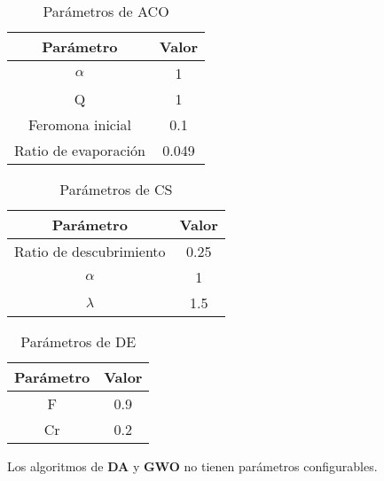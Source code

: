 \begin{table}[H]
    \centering
    \begin{tabular}{ c c }
        \hline
        \textbf{Parámetro}   & \textbf{Valor} \\
        \hline
        $\alpha$             & 1              \\
        Q                    & 1              \\
        Feromona inicial     & 0.1            \\
        Ratio de evaporación & 0.049          \\
        \hline
    \end{tabular}
    \caption{Parámetros de ACO}
\end{table}

\begin{table}[H]
    \centering
    \begin{tabular}{ c c }
        \hline
        \textbf{Parámetro}      & \textbf{Valor} \\
        \hline
        Ratio de descubrimiento & 0.25           \\
        $\alpha$                & 1              \\
        $\lambda$               & 1.5            \\
        \hline
    \end{tabular}
    \caption{Parámetros de CS}
\end{table}

\begin{table}[H]
    \centering
    \begin{tabular}{ c c }
        \hline
        \textbf{Parámetro} & \textbf{Valor} \\
        \hline
        F                  & 0.9            \\
        Cr                 & 0.2            \\
        \hline
    \end{tabular}
    \caption{Parámetros de DE}
\end{table}

Los algoritmos de \textbf{DA} y \textbf{GWO} no tienen parámetros configurables.